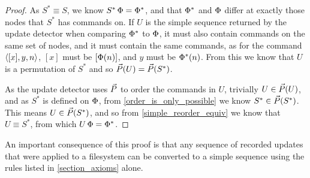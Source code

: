 \begin{proof}
As $S^*\equiv S$, we know $S^*\,\Phi=\Phi^*$, and that
$\Phi^*$ and $\Phi$ differ at exactly those nodes that $S^*$ has commands on.
If $U$ is the simple sequence returned by the update detector
when comparing $\Phi^*$ to $\Phi$, it must also contain commands on the same set of nodes,
and it must contain the same commands,
as for the command $\langle{[x],y,n}\rangle$, $[x]$ must be $[\Phi(n)]$, and $y$ must be $\Phi^*(n)$.
From this we know that $U$ is a permutation of $S^*$ and so $\vec{P}({U})=\vec{P}({S^*})$.

As the update detector uses $\vec{P}$ to order the commands in $U$,
trivially $U\in\vec{P}({U})$,
and as $S^*$ is defined on $\Phi$,
from \cref{order_is_only_possible} we know $S^* \in \vec{P}({S^*})$.
This means $U\in\vec{P}({S^*})$,
and so from \cref{simple_reorder_equiv} we know that $U\equiv S^*$,
from which $U\,\Phi=\Phi^*$.
\end{proof}

An important consequence of this proof is that any sequence
of recorded updates that were applied to a filesystem can be
converted to a simple sequence using the rules listed in
\cref{section_axioms} alone.

